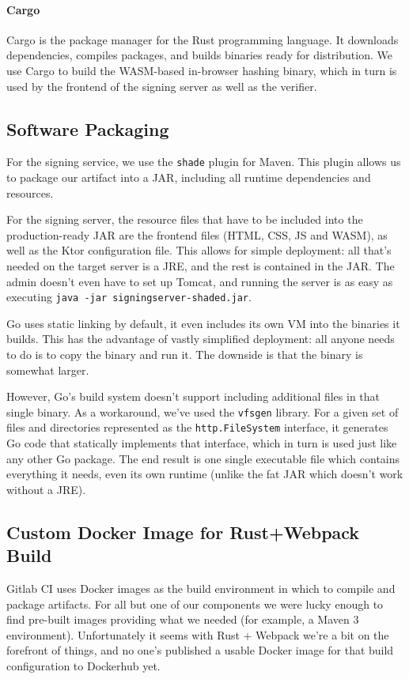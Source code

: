 \paragraph{Cargo} Cargo is the package manager for the Rust programming language.
It downloads dependencies, compiles packages,
and builds binaries ready for distribution.
We use Cargo to build the \gls{WASM}-based in-browser hashing binary,
which in turn is used by the frontend of the signing server as well as the verifier.

\subsection{Software Packaging}\label{subsec:software-packaging}
For the signing service,
we use the \texttt{shade} plugin for Maven.
This plugin allows us to package our artifact into a \gls{JAR},
including all runtime dependencies and resources.

For the signing server,
the resource files that have to be included into the production-ready \gls{JAR}
are the frontend files (\gls{HTML}, \gls{CSS}, \gls{JS} and \gls{WASM}),
as well as the Ktor configuration file.
This allows for simple deployment:
all that's needed on the target server is a \gls{JRE},
and the rest is contained in the \gls{JAR}.
The admin doesn't even have to set up Tomcat,
and running the server is as easy as executing \texttt{java -jar signingserver-shaded.jar}.

Go uses static linking by default,
it even includes its own \gls{VM} into the binaries it builds.
This has the advantage of vastly simplified deployment:
all anyone needs to do is to copy the binary and run it.
The downside is that the binary is somewhat larger.

However, Go's build system doesn't support including additional files in that single binary.
As a workaround, we've used the \texttt{vfsgen} library.
For a given set of files and directories represented as the \texttt{http.FileSystem} interface,
it generates Go code that statically implements that interface,
which in turn is used just like any other Go package.
The end result is one single executable file which contains everything it needs,
even its own runtime (unlike the fat \gls{JAR} which doesn't work without a \gls{JRE}).

\subsection{Custom Docker Image for Rust+Webpack Build}\label{subsec:custom-docker-image-for-rust+webpack-build}
Gitlab \gls{CI} uses Docker images as the build environment in which to compile and package artifacts.
For all but one of our components we were lucky enough to find pre-built images providing what we needed (for example, a Maven 3 environment).
Unfortunately it seems with Rust + Webpack we're a bit on the forefront of things,
and no one's published a usable Docker image for that build configuration to Dockerhub yet.

